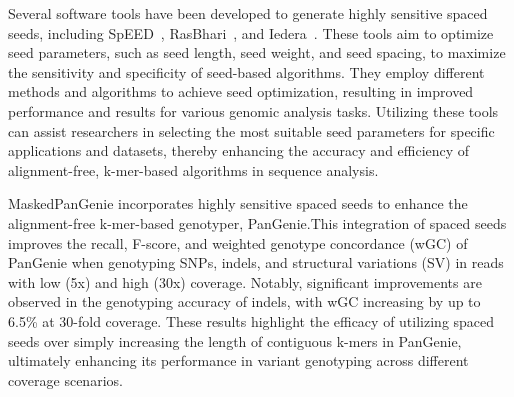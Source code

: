 \documentclass{PHlab-thesis}
\begin{document}
Several software tools have been developed to generate highly sensitive spaced seeds, including SpEED~\cite{Lucian2011SpEED}, RasBhari~\cite{Hahn2016Rasbhari}, and Iedera~\cite{Kucherov2006Sensitivity}. These tools aim to optimize seed parameters, such as seed length, seed weight, and seed spacing, to maximize the sensitivity and specificity of seed-based algorithms. They employ different methods and algorithms to achieve seed optimization, resulting in improved performance and results for various genomic analysis tasks. Utilizing these tools can assist researchers in selecting the most suitable seed parameters for specific applications and datasets, thereby enhancing the accuracy and efficiency of alignment-free, k-mer-based algorithms in sequence analysis.

MaskedPanGenie incorporates highly sensitive spaced seeds to enhance the alignment-free k-mer-based genotyper, PanGenie.This integration of spaced seeds improves the recall, F-score, and weighted genotype concordance (wGC) of PanGenie when genotyping SNPs, indels, and structural variations (SV) in reads with low (5x) and high (30x) coverage. Notably, significant improvements are observed in the genotyping accuracy of indels, with wGC increasing by up to 6.5\% at 30-fold coverage. These results highlight the efficacy of utilizing spaced seeds over simply increasing the length of contiguous k-mers in PanGenie, ultimately enhancing its performance in variant genotyping across different coverage scenarios.
\end{document}
